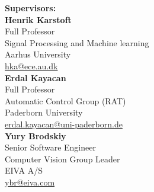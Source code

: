 \begin{minipage}[t]{0.485\textwidth}
\begin{flushleft}

\textbf{Supervisors:} \\[5pt]

\textbf{Henrik Karstoft} \\
Full Professor \\
Signal Processing and Machine learning \\
Aarhus University \\
\href{mailto:hka@ece.au.dk}{hka@ece.au.dk} \\[5pt]

\textbf{Erdal Kayacan} \\
Full Professor \\
Automatic Control Group (RAT) \\
Paderborn University \\
\href{mailto:abkar@mpe.au.dk}{erdal.kayacan@uni-paderborn.de} \\[5pt]

\textbf{Yury Brodskiy} \\
Senior Software Engineer \\
Computer Vision Group Leader \\
EIVA A/S \\
\href{mailto:ybr@eiva.com}{ybr@eiva.com} \\

\end{flushleft}
\end{minipage}

\vspace{5ex}

\noindent\makebox[\linewidth]{{\rule{0.8\paperwidth}{4pt}}}


\vfill


